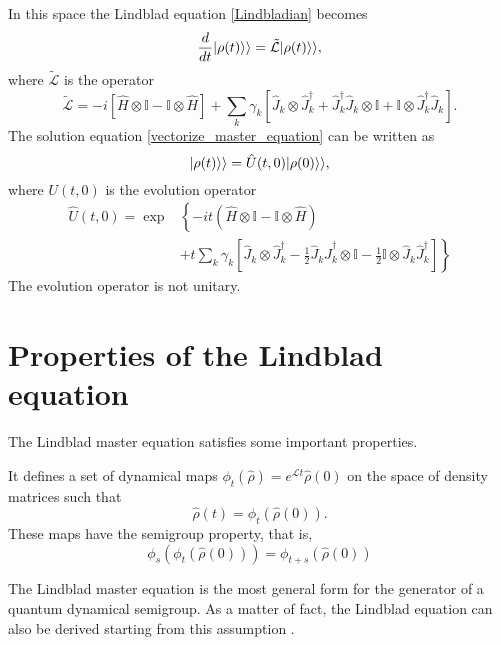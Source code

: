 In this space the Lindblad equation \eqref{Lindbladian} becomes
\begin{equation}\label{vectorize_master_equation}
    \frac{d}{dt}\lvert\rho(t)\rangle\rangle = \tilde{\mathcal{L}}\lvert\rho(t)\rangle\rangle,
\end{equation}
where $\tilde{\mathcal{L}}$ is the operator 
\begin{equation}
    \tilde{\mathcal{L}}=-i\left[\hat H\otimes\mathbb{I}-\mathbb{I}\otimes\hat H\right]+\sum_{k}\gamma_{k}\left[\hat J_{k}\otimes\hat J^\dagger_{k} + \hat J_{k}^\dagger \hat J_{k}\otimes\mathbb{I} +\mathbb{I}\otimes\hat J_{k}^\dagger \hat J_{k}\right].
\end{equation}
The solution equation \eqref{vectorize_master_equation} can be written as
\begin{equation}
    \lvert\rho(t)\rangle\rangle = \hat U(t,0)\lvert\rho(0)\rangle\rangle,
\end{equation}
where $U(t,0)$ is the evolution operator
\begin{equation}
    \begin{split}
        \hat U(t,0) = \exp&\left\{-it\left(\hat H\otimes\mathbb{I}-\mathbb{I}\otimes\hat H\right)\phantom{\left[\frac{1}{2}\right]}\right.\\
        &+\left. t\sum_{k}\gamma_{k}\left[\hat J_{k}\otimes\hat J^\dagger_{k}-\frac{1}{2}\hat J_{k}\hat J^\dagger_{k}\otimes\mathbb{I}-\frac{1}{2}\mathbb{I}\otimes\hat J_{k}\hat J^\dagger_{k}\right]\right\}
    \end{split}
\end{equation}
The evolution operator is not unitary.


\section{Properties of the Lindblad equation}
The Lindblad master equation satisfies some important properties.

It defines a set of dynamical maps $\phi_t\left(\hat\rho\right)= e^{\mathcal{L}t}\hat\rho(0)$ on the space of density matrices such that
\begin{equation}
    \hat\rho(t) = \phi_t\left(\hat\rho(0)\right).
\end{equation}
These maps have the semigroup property, that is,
\begin{equation}
    \phi_s\left(\phi_t\left(\hat\rho(0)\right)\right)=\phi_{t+s}\left(\hat\rho(0)\right)
\end{equation}

The Lindblad master equation is the most general form for the generator of a quantum dynamical semigroup. As a matter of fact, the Lindblad equation can also be derived starting from this assumption \cite{Breuer-Petruccione}.

